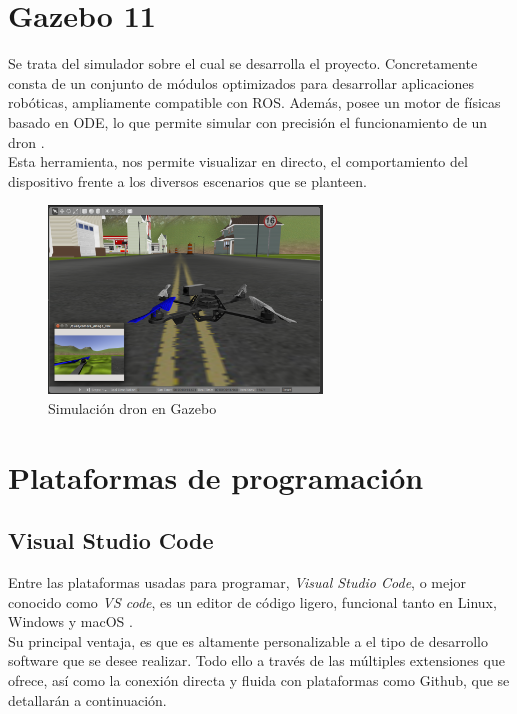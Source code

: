 \section{Gazebo 11}
\label{sec:gazebo}

Se trata del simulador sobre el cual se desarrolla el proyecto. Concretamente consta de un conjunto de módulos optimizados para desarrollar aplicaciones robóticas, ampliamente compatible con \ac{ROS}. Además, posee un motor de físicas basado en ODE, lo que permite simular con precisión el funcionamiento de un dron \cite{gazebo-def}.\\

Esta herramienta, nos permite visualizar en directo, el comportamiento del dispositivo frente a los diversos escenarios que se planteen.

\begin{figure} [H]
	\begin{center}
	\includegraphics[height=5cm]{imagenes/cap3/2_gazebo_drone.png}
	\end{center}
	\caption[Simulación dron en Gazebo]{Simulación dron en Gazebo}
	\label{fig:gazebo}
\end{figure}

\section{Plataformas de programación}
\label{sec:plataformas_de_programacion}

\subsection{Visual Studio Code}
\label{subsec:visual_studio_code}

Entre las plataformas usadas para programar, \emph{Visual Studio Code}, o mejor conocido como \emph{VS code}, es un editor de código ligero, funcional tanto en Linux, Windows y macOS \cite{vscode-def}.\\

Su principal ventaja, es que es altamente personalizable a el tipo de desarrollo software que se desee realizar. Todo ello a través de las múltiples extensiones que ofrece, así como la conexión directa y fluida con plataformas como Github, que se detallarán a continuación.\\

